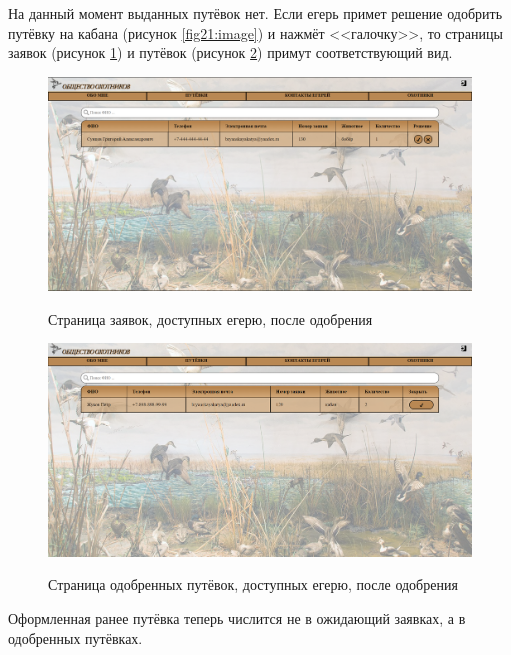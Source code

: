 	На данный момент выданных путёвок нет. Если егерь примет решение одобрить путёвку на кабана (рисунок \ref{fig21:image}) и нажмёт <<галочку>>, то страницы заявок (рисунок \ref{fig24:image}) и путёвок (рисунок \ref{fig25:image}) примут соответствующий вид.
	
	\begin{figure}[h!]
		\centering
		\begin{center}
			{\includegraphics[scale=0.34]{schemes/screens/requests_huntsman_add.png}}
			\caption{Страница заявок, доступных егерю, после одобрения}
			\label{fig24:image}
		\end{center}
	\end{figure} 

	\begin{figure}[pt!]
		\centering
		\begin{center}
			{\includegraphics[scale=0.34]{schemes/screens/vouchers_huntsman_add.png}}
			\caption{Страница одобренных путёвок, доступных егерю, после одобрения}
			\label{fig25:image}
		\end{center}
	\end{figure} 
	\newpage

	Оформленная ранее путёвка теперь числится не в ожидающий заявках, а в одобренных путёвках.
	

